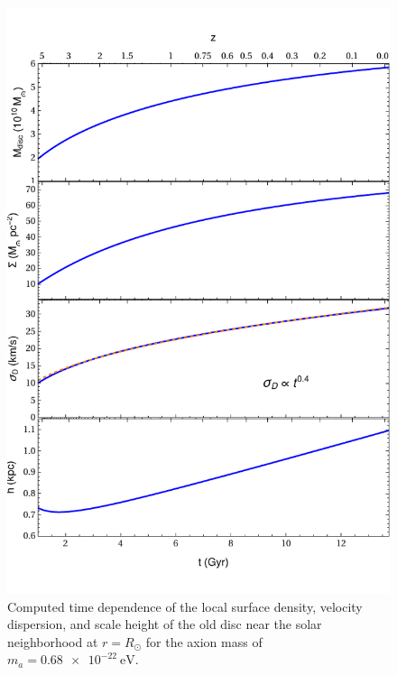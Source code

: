 \documentclass[usenatbib]{mnras}
\begin{document}
\begin{figure}
\includegraphics[width=\columnwidth]{time_dep}
\vspace*{-5mm}
\caption{Computed time dependence of the local surface density, velocity dispersion, and scale height of the old disc near the solar neighborhood at $r = R_{\odot}$ for the axion mass of $m_a = \SI{0.68 e-22}{\electronvolt}$.}
\label{fig:time_dep}
\end{figure}
\end{document}
